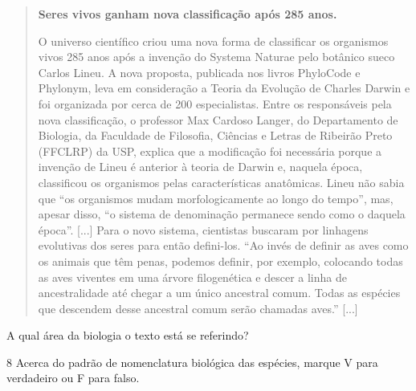 \begin{quote}
\textbf{Seres vivos ganham nova classificação após 285 anos.}

O universo científico criou uma nova forma de classificar os organismos
vivos 285 anos após a invenção do Systema Naturae pelo botânico sueco
Carlos Lineu. A nova proposta, publicada nos livros PhyloCode e
Phylonym, leva em consideração a Teoria da Evolução de Charles Darwin e
foi organizada por cerca de 200 especialistas. 
Entre os responsáveis
pela nova classificação, o professor Max Cardoso Langer, do Departamento
de Biologia, da Faculdade de Filosofia, Ciências e Letras de Ribeirão
Preto (FFCLRP) da USP, explica que a modificação foi necessária porque a
invenção de Lineu é anterior à teoria de Darwin e, naquela época,
classificou os organismos pelas características anatômicas. Lineu não
sabia que ``os organismos mudam morfologicamente ao longo do tempo'',
mas, apesar disso, ``o sistema de denominação permanece sendo como o
daquela época''.  [...]
Para o novo sistema, cientistas buscaram por linhagens
evolutivas dos seres para então defini-los. ``Ao invés de definir as
aves como os animais que têm penas, podemos definir, por exemplo,
colocando todas as aves viventes em uma árvore filogenética e descer a
linha de ancestralidade até chegar a um único ancestral comum. Todas as
espécies que descendem desse ancestral comum serão chamadas aves.'' [...]

\end{quote}

A qual área da biologia o texto está se referindo?



\num{8}  Acerca do padrão de nomenclatura biológica das espécies, marque V para verdadeiro ou F para falso.

